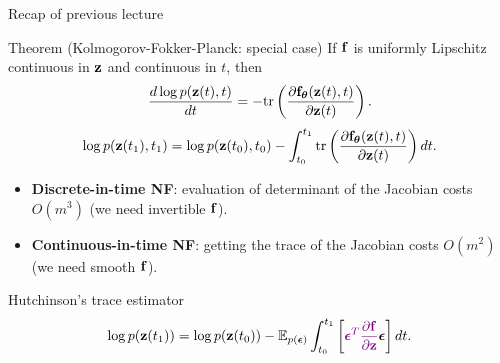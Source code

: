 \begin{frame}{Recap of previous lecture}
	\begin{block}{Theorem (Kolmogorov-Fokker-Planck: special case)}
		If $\mathbf{f}$ is uniformly Lipschitz continuous in $\mathbf{z}$ and continuous in $t$, then
		\[
			\frac{d \log p(\mathbf{z}(t), t)}{d t} = - \text{tr} \left( \frac{\partial \mathbf{f}_{\boldsymbol{\theta}}(\mathbf{z}(t), t)}{\partial \mathbf{z}(t)} \right).
		\]
		\[
			\log p(\mathbf{z}(t_1), t_1) = \log p(\mathbf{z}(t_0), t_0) - \int_{t_0}^{t_1} \text{tr}  \left( \frac{\partial \mathbf{f}_{\boldsymbol{\theta}}(\mathbf{z}(t), t)}{\partial \mathbf{z}(t)} \right) dt.
		\]
	\end{block}
	\vspace{-0.3cm}
	\begin{itemize}
		\item \textbf{Discrete-in-time NF}: evaluation of determinant of the Jacobian costs $O(m^3)$ (we need invertible $\mathbf{f}$).
		\item \textbf{Continuous-in-time NF}: getting the trace of the Jacobian costs $O(m^2)$ (we need smooth $\mathbf{f}$).
	\end{itemize}
	\begin{block}{Hutchinson's trace estimator}
		\vspace{-0.3cm}
		\[
  \log p(\mathbf{z}(t_1)) = \log p(\mathbf{z}(t_0)) - \mathbb{E}_{p(\boldsymbol{\epsilon})} \int_{t_0}^{t_1} \left[ {\color{violet}\boldsymbol{\epsilon}^T \frac{\partial \mathbf{f}}{\partial \mathbf{z}}} \boldsymbol{\epsilon} \right] dt.
		\]
	\end{block}
\end{frame}
